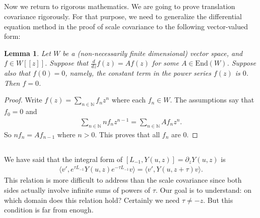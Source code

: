 \documentclass[11pt,b5paper,notitlepage]{article}
\theoremstyle{definition}
\theoremstyle{plain}
\newtheorem{lm}[df]{Lemma}
\newcommand{\End}{\mathrm{End}} %
\newcommand{\bigbk}[1]{\big\langle {#1}\big\rangle}
\newcommand{\Nbb}{\mathbb N}
\numberwithin{equation}{section}
\begin{document}
\subsection{}

Now we return to rigorous mathematics. We are going to prove translation covariance rigorously. For that purpose, we need to generalize the differential equation method in the proof of scale covariance to the following vector-valued form:

\begin{lm}\label{lb21}
Let $W$ be a (non-necessarily finite dimensional) vector space, and $f\in W[[z]]$. Suppose that $\frac d{dz}f(z)=Af(z)$ for some $A\in\End(W)$. Suppose also that $f(0)=0$, namely, the constant term in the power series $f(z)$ is $0$. Then $f=0$.	
\end{lm}



\begin{proof}
Write $f(z)=\sum_{n\in\Nbb}f_nz^n$ where each $f_n\in W$. The assumptions say that $f_0=0$ and
\begin{align*}
\sum_{n\in\Nbb} nf_nz^{n-1}=\sum_{n\in\Nbb} Af_nz^n.	
\end{align*}
So $nf_n=Af_{n-1}$ where $n>0$. This proves that all $f_n$ are $0$.
\end{proof}













\subsection{}

We have said that the integral form of $[L_{-1},Y(u,z)]=\partial_z Y(u,z)$ is
\begin{align}
\bigbk{v',e^{\tau L_{-1}}Y(u,z)e^{-\tau L_{-1}}v}=\bigbk{v',Y(u,z+\tau)v}.\label{eq24}	
\end{align}
This relation is more difficult to address than the scale covariance since both sides actually involve infinite sums of powers of $\tau$. Our goal is to understand: on which domain does this relation hold? Certainly we need $\tau\neq -z$. But this condition is far from enough.
\end{document}
